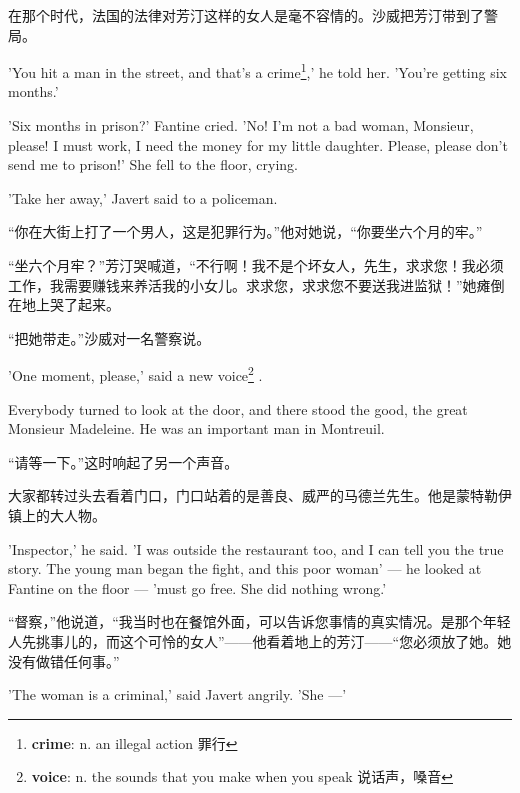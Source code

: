 \documentclass[fontset=ubuntu, zihao=5]{ctexart}
\begin{document}
\begin{paracol}{2}
  \switchcolumn

  在那个时代，法国的法律对芳汀这样的女人是毫不容情的。沙威把芳汀带到了警局。

  \switchcolumn*

  'You hit a man in the street, and that's a crime\footnote{\textbf{crime}: n. an illegal action 罪行},' he told her. 'You're getting six months.'


  'Six months in prison?' Fantine cried. 'No! I'm not a bad woman, Monsieur, please! I must work, I need the money for my little daughter. Please, please don't send me to prison!' She fell to the floor, crying.

  'Take her away,' Javert said to a policeman.

  \switchcolumn

  “你在大街上打了一个男人，这是犯罪行为。”他对她说，“你要坐六个月的牢。”

  “坐六个月牢？”芳汀哭喊道，“不行啊！我不是个坏女人，先生，求求您！我必须工作，我需要赚钱来养活我的小女儿。求求您，求求您不要送我进监狱！”她瘫倒在地上哭了起来。


  “把她带走。”沙威对一名警察说。

  \switchcolumn*

  'One moment, please,' said a new voice\footnote{\textbf{voice}: n. the sounds that you make when you speak 说话声，嗓音}
  .

  Everybody turned to look at the door, and there stood the good, the great Monsieur Madeleine. He was an important man in Montreuil.

  \switchcolumn

  “请等一下。”这时响起了另一个声音。

  大家都转过头去看着门口，门口站着的是善良、威严的马德兰先生。他是蒙特勒伊镇上的大人物。

  \switchcolumn*

  'Inspector,' he said. 'I was outside the restaurant too, and I can tell you
  the true story. The young man began the fight, and this poor woman' --- he
  looked at Fantine on the floor --- 'must go free. She did nothing wrong.'

  \switchcolumn

  “督察，”他说道，“我当时也在餐馆外面，可以告诉您事情的真实情况。是那个年轻人先挑事儿的，而这个可怜的女人”——他看着地上的芳汀——“您必须放了她。她没有做错任何事。”

  \switchcolumn*

  'The woman is a criminal,' said Javert angrily. 'She ---'



\end{paracol}
\end{document}
